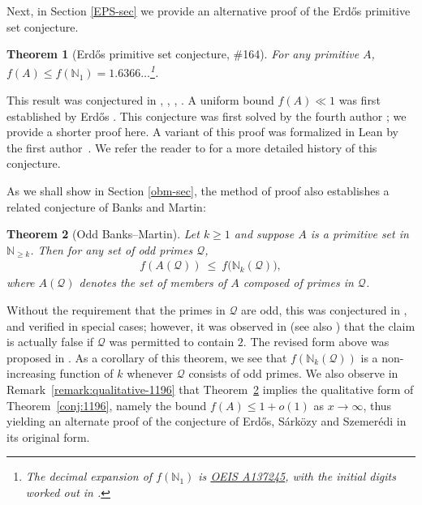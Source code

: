 \documentclass[12pt]{amsart}
\newtheorem{theorem}{Theorem}[section]
\theoremstyle{definition}
\theoremstyle{remark}
\numberwithin{equation}{section}
\newcommand{\N}{{\mathbb N}}
\newcommand{\1}{{\mathbf 1}}
\newcommand{\Erdos}{{Erd\H{o}s}}
\newcommand{\Sarkozy}{S\'{a}rk\"{o}zy} %
\newcommand{\Szemeredi}{Szemer\'edi}
\begin{document}
Next, in Section \ref{EPS-sec} we provide an alternative proof of the \Erdos{} primitive set conjecture.

\begin{theorem}[\Erdos{} primitive set conjecture, \#164] \label{conj:EPS}
For any primitive $A$, $f(A)\le f(\N_1) = 1.6366\dots$\footnote{The decimal expansion of $f(\N_1)$ is \href{https://oeis.org/A137245}{OEIS A137245}, with the initial digits worked out in \cite[pp.~208--209]{cohen}.}.
\end{theorem}

This result was conjectured in \cite{erdos76}, \cite[Conjecture 2.1]{erdos86}, \cite[1.12]{various}, \cite[Problem \#164]{bloom}.  A uniform bound $f(A) \ll 1$ was first established by \Erdos{} \cite{erdos35}.  This conjecture was first solved by the fourth author \cite{Lichtman}; we provide a shorter proof here.  A variant of this proof was formalized in Lean by the first author~\cite{lean-erdos164}.  We refer the reader to \cite{Lichtman} for a more detailed history of this conjecture.

As we shall show in Section \ref{obm-sec}, the method of proof also establishes a related conjecture of Banks and Martin:

\begin{theorem}[Odd Banks--Martin] \label{conj:oddBM}
Let $k\ge 1$ and suppose $A$ is a primitive set in $\N_{\geq k}$. Then for any set of odd primes $\mathcal Q$,
\begin{align*}
f(A(\mathcal Q)) \ \le\ f\big(\mathbb N_k(\mathcal Q)\big),
\end{align*}
where $A(\mathcal Q)$ denotes the set of members of $A$ composed of primes in $\mathcal Q$.
\end{theorem}

Without the requirement that the primes in $\mathcal Q$ are odd, this was conjectured in \cite{banks-martin}, and verified in special cases; however, it was observed in \cite{Lalmost} (see also \cite{Lichtman, glw}) that the claim is actually false if ${\mathcal Q}$ was permitted to contain $2$. The revised form above was proposed in \cite[Conj. 7.1]{Lichtman}.  As a corollary of this theorem, we see that $f(\mathbb N_k({\mathcal Q}))$ is a non-increasing function of $k$ whenever ${\mathcal Q}$ consists of odd primes. We also observe in Remark~\ref{remark:qualitative-1196} that Theorem~\ref{conj:oddBM} implies the qualitative form of Theorem~\ref{conj:1196}, namely the bound $f(A) \leq 1+o(1)$ as $x \to \infty$, thus yielding an alternate proof of the conjecture of \Erdos{}, \Sarkozy{} and \Szemeredi{} in its original form. 
\end{document}
